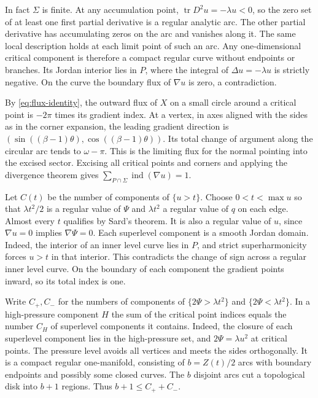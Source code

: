 \documentclass[11pt,a4paper,reqno]{amsart}
\theoremstyle{remark}
\numberwithin{equation}{section}
\begin{document}
In fact $\Sigma$ is finite. At any accumulation point,
$\operatorname{tr}D^2u=-\lambda u<0$, so the zero set of at least one first
partial derivative is a regular analytic arc. The other partial derivative
has accumulating zeros on the arc and vanishes along it. The same local
description holds at each limit point of such an arc. Any one-dimensional
critical component is therefore a compact regular curve without endpoints
or branches. Its Jordan interior lies in $P$, where the integral of
$\Delta u=-\lambda u$ is strictly negative. On the curve the boundary flux
of $\nabla u$ is zero, a contradiction.

By \eqref{eq:flux-identity}, the outward flux of $X$ on a small circle
around a critical point is $-2\pi$ times its gradient index. At a vertex,
in axes aligned with the sides as in the corner expansion, the leading
gradient direction is
$(\sin((\beta-1)\theta),\cos((\beta-1)\theta))$. Its total change of
argument along the circular arc tends to $\omega-\pi$. This is the limiting
flux for the normal pointing into the excised sector. Excising all critical
points and corners and applying the divergence theorem gives
$\sum_{P\cap\Sigma}\operatorname{ind}(\nabla u)=1$.

Let $C(t)$ be the number of components of $\{u>t\}$. Choose $0<t<\max u$
so that $\lambda t^2/2$ is a regular value of $\Psi$ and $\lambda t^2$ a
regular value of $q$ on each edge. Almost every $t$ qualifies by Sard's
theorem. It is also a regular value of $u$, since $\nabla u=0$ implies
$\nabla\Psi=0$. Each superlevel component is a smooth Jordan domain.
Indeed, the interior of an inner level curve lies in $P$, and strict
superharmonicity forces $u>t$ in that interior. This contradicts the
change of sign across a regular inner level curve. On the boundary of each
component the gradient points inward, so its total index is one.

Write $C_+,C_-$ for the numbers of components of
$\{2\Psi>\lambda t^2\}$ and $\{2\Psi<\lambda t^2\}$. In a high-pressure
component $H$ the sum of the critical point indices equals the number $C_H$
of superlevel components it contains. Indeed, the closure of each superlevel
component lies in the high-pressure set, and $2\Psi=\lambda u^2$ at critical
points. The pressure level avoids all vertices and meets the sides
orthogonally. It is a compact regular one-manifold, consisting of
$b=Z(t)/2$ arcs with boundary endpoints and possibly some closed curves.
The $b$ disjoint arcs cut a topological disk into $b+1$ regions. Thus
$b+1\le C_++C_-$.
\end{document}
